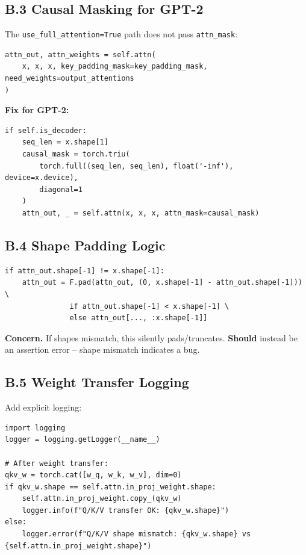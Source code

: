 \subsection{B.3 Causal Masking for GPT-2}

The \texttt{use\_full\_attention=True} path does not pass \texttt{attn\_mask}:

\begin{lstlisting}
attn_out, attn_weights = self.attn(
    x, x, x, key_padding_mask=key_padding_mask, need_weights=output_attentions
)
\end{lstlisting}

\textbf{Fix for GPT-2:}

\begin{lstlisting}
if self.is_decoder:
    seq_len = x.shape[1]
    causal_mask = torch.triu(
        torch.full((seq_len, seq_len), float('-inf'), device=x.device),
        diagonal=1
    )
    attn_out, _ = self.attn(x, x, x, attn_mask=causal_mask)
\end{lstlisting}

\subsection{B.4 Shape Padding Logic}

\begin{lstlisting}
if attn_out.shape[-1] != x.shape[-1]:
    attn_out = F.pad(attn_out, (0, x.shape[-1] - attn_out.shape[-1])) \
               if attn_out.shape[-1] < x.shape[-1] \
               else attn_out[..., :x.shape[-1]]
\end{lstlisting}

\textbf{Concern.} If shapes mismatch, this silently pads/truncates. \textbf{Should} 
instead be an assertion error -- shape mismatch indicates a bug.

\subsection{B.5 Weight Transfer Logging}

Add explicit logging:

\begin{lstlisting}
import logging
logger = logging.getLogger(__name__)

# After weight transfer:
qkv_w = torch.cat([w_q, w_k, w_v], dim=0)
if qkv_w.shape == self.attn.in_proj_weight.shape:
    self.attn.in_proj_weight.copy_(qkv_w)
    logger.info(f"Q/K/V transfer OK: {qkv_w.shape}")
else:
    logger.error(f"Q/K/V shape mismatch: {qkv_w.shape} vs {self.attn.in_proj_weight.shape}")
\end{lstlisting}

